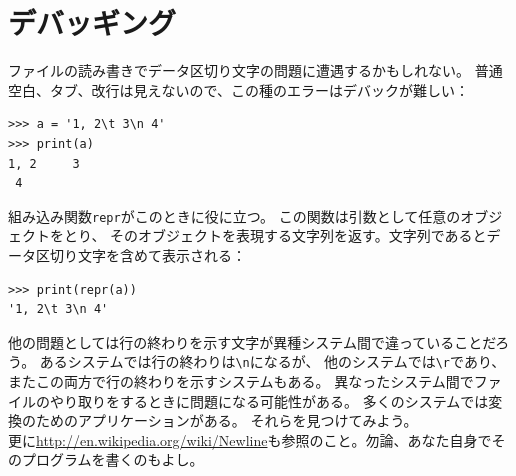 \documentclass[a4j,12pt,makeidx]{jbook}
\begin{document}
\section{デバッギング}
ファイルの読み書きでデータ区切り文字の問題に遭遇するかもしれない。
普通空白、タブ、改行は見えないので、この種のエラーはデバックが難しい：
\begin{verbatim}
>>> a = '1, 2\t 3\n 4'
>>> print(a)
1, 2	 3
 4
\end{verbatim}  
組み込み関数{\tt repr}がこのときに役に立つ。
この関数は引数として任意のオブジェクトをとり、
そのオブジェクトを表現する文字列を返す。文字列であるとデータ区切り文字を含めて表示される：
\begin{verbatim}
>>> print(repr(a))
'1, 2\t 3\n 4'
\end{verbatim}  \par
他の問題としては行の終わりを示す文字が異種システム間で違っていることだろう。
あるシステムでは行の終わりは{\verb"\n"}になるが、
他のシステムでは{\verb"\r"}であり、またこの両方で行の終わりを示すシステムもある。
異なったシステム間でファイルのやり取りをするときに問題になる可能性がある。
多くのシステムでは変換のためのアプリケーションがある。
それらを見つけてみよう。\\
更に\url{http://en.wikipedia.org/wiki/Newline}も参照のこと。勿論、あなた自身でそのプログラムを書くのもよし。
%
\end{document}
